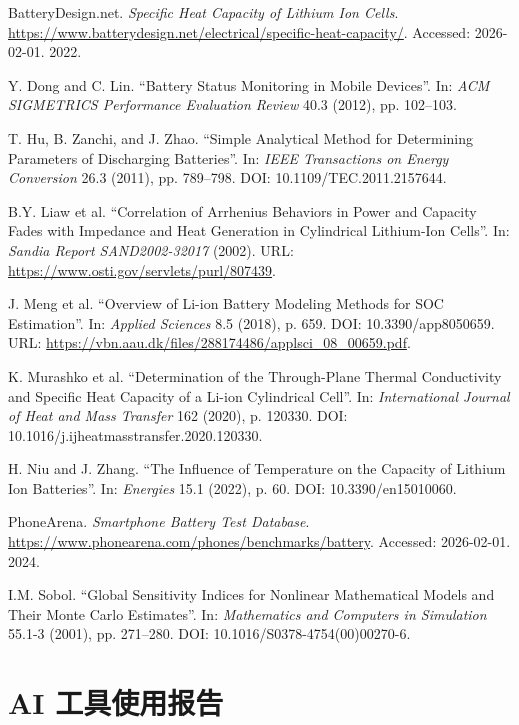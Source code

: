 \documentclass[11pt,a4paper]{ctexart}
\begin{document}
\begingroup
\sloppy
\begin{enumerate}[label={[\arabic*]},leftmargin=3.2em,itemsep=0.3em,parsep=0.1em]
\item BatteryDesign.net. \emph{Specific Heat Capacity of Lithium Ion Cells}. \url{https://www.batterydesign.net/electrical/specific-heat-capacity/}. Accessed: 2026-02-01. 2022.
\item Y. Dong and C. Lin. ``Battery Status Monitoring in Mobile Devices''. In: \emph{ACM SIGMETRICS Performance Evaluation Review} 40.3 (2012), pp. 102--103.
\item T. Hu, B. Zanchi, and J. Zhao. ``Simple Analytical Method for Determining Parameters of Discharging Batteries''. In: \emph{IEEE Transactions on Energy Conversion} 26.3 (2011), pp. 789--798. DOI: 10.1109/TEC.2011.2157644.
\item B.Y. Liaw et al. ``Correlation of Arrhenius Behaviors in Power and Capacity Fades with Impedance and Heat Generation in Cylindrical Lithium-Ion Cells''. In: \emph{Sandia Report SAND2002-32017} (2002). URL: \url{https://www.osti.gov/servlets/purl/807439}.
\item J. Meng et al. ``Overview of Li-ion Battery Modeling Methods for SOC Estimation''. In: \emph{Applied Sciences} 8.5 (2018), p. 659. DOI: 10.3390/app8050659. URL: \url{https://vbn.aau.dk/files/288174486/applsci_08_00659.pdf}.
\item K. Murashko et al. ``Determination of the Through-Plane Thermal Conductivity and Specific Heat Capacity of a Li-ion Cylindrical Cell''. In: \emph{International Journal of Heat and Mass Transfer} 162 (2020), p. 120330. DOI: 10.1016/j.ijheatmasstransfer.2020.120330.
\item H. Niu and J. Zhang. ``The Influence of Temperature on the Capacity of Lithium Ion Batteries''. In: \emph{Energies} 15.1 (2022), p. 60. DOI: 10.3390/en15010060.
\item PhoneArena. \emph{Smartphone Battery Test Database}. \url{https://www.phonearena.com/phones/benchmarks/battery}. Accessed: 2026-02-01. 2024.
\item I.M. Sobol. ``Global Sensitivity Indices for Nonlinear Mathematical Models and Their Monte Carlo Estimates''. In: \emph{Mathematics and Computers in Simulation} 55.1-3 (2001), pp. 271--280. DOI: 10.1016/S0378-4754(00)00270-6.
\end{enumerate}
\endgroup

\newpage

\section*{AI 工具使用报告}
\end{document}
